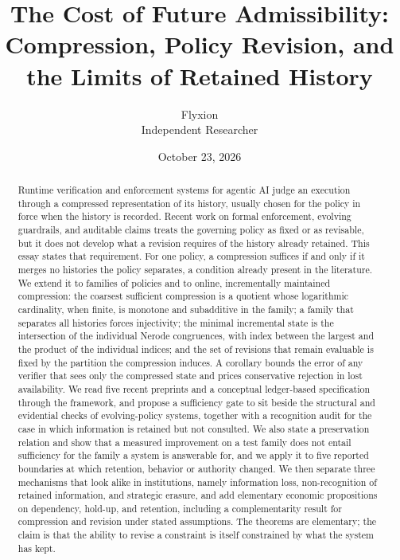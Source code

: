 \documentclass[11pt]{article}
\title{The Cost of Future Admissibility:\\
Compression, Policy Revision, and the Limits of Retained History}
\author{Flyxion\\ Independent Researcher}
\date{October 23, 2026}
\theoremstyle{definition}
\theoremstyle{remark}
\begin{document}
\maketitle

\begin{abstract}
Runtime verification and enforcement systems for agentic AI judge an execution through a compressed representation of its history, usually chosen for the policy in force when the history is recorded. Recent work on formal enforcement, evolving guardrails, and auditable claims treats the governing policy as fixed or as revisable, but it does not develop what a revision requires of the history already retained. This essay states that requirement. For one policy, a compression suffices if and only if it merges no histories the policy separates, a condition already present in the literature. We extend it to families of policies and to online, incrementally maintained compression: the coarsest sufficient compression is a quotient whose logarithmic cardinality, when finite, is monotone and subadditive in the family; a family that separates all histories forces injectivity; the minimal incremental state is the intersection of the individual Nerode congruences, with index between the largest and the product of the individual indices; and the set of revisions that remain evaluable is fixed by the partition the compression induces. A corollary bounds the error of any verifier that sees only the compressed state and prices conservative rejection in lost availability. We read five recent preprints and a conceptual ledger-based specification through the framework, and propose a sufficiency gate to sit beside the structural and evidential checks of evolving-policy systems, together with a recognition audit for the case in which information is retained but not consulted. We also state a preservation relation and show that a measured improvement on a test family does not entail sufficiency for the family a system is answerable for, and we apply it to five reported boundaries at which retention, behavior or authority changed. We then separate three mechanisms that look alike in institutions, namely information loss, non-recognition of retained information, and strategic erasure, and add elementary economic propositions on dependency, hold-up, and retention, including a complementarity result for compression and revision under stated assumptions. The theorems are elementary; the claim is that the ability to revise a constraint is itself constrained by what the system has kept.
\end{abstract}
\end{document}
